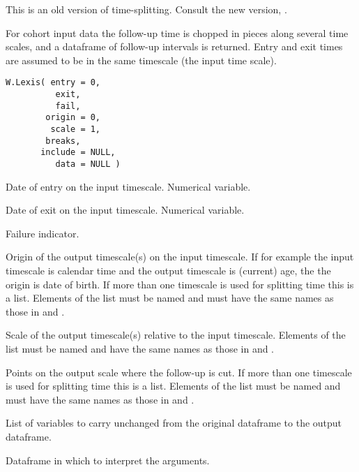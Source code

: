 \begin{Description}\relax
This is an old version of time-splitting. Consult the new version,
.

For cohort input data the follow-up time is chopped in pieces along
several time scales, and a dataframe of follow-up intervals is
returned. Entry and exit times are assumed to be in the same timescale
(the input time scale).
\end{Description}
\begin{Usage}
\begin{verbatim}
W.Lexis( entry = 0,
          exit,
          fail,
        origin = 0,
         scale = 1,
        breaks,
       include = NULL,
          data = NULL )
\end{verbatim}
\end{Usage}
\begin{Arguments}
\begin{ldescription}
\item[\code{entry}] Date of entry on the input timescale. Numerical variable.
\item[\code{exit}] Date of exit on the input timescale. Numerical variable.
\item[\code{fail}] Failure indicator.
\item[\code{origin}] Origin of the output timescale(s) on the input
timescale. If for example the input timescale is calendar time and
the output timescale is (current) age, the the origin is date of
birth. If more than one timescale is used for splitting time
this is a list. Elements of the list must be named and must have the
same names as those in  and .
\item[\code{scale}] Scale of the output timescale(s) relative to the input
timescale. Elements of the list must be named and have the same
names as those in  and .
\item[\code{breaks}] Points on the output scale where the follow-up is
cut. If more than one timescale is used for splitting time this is a
list. Elements of the list must be named and must have the same
names as those in  and .
\item[\code{include}] List of variables to carry unchanged from the original
dataframe to the output dataframe.
\item[\code{data}] Dataframe in which to interpret the arguments.
\end{ldescription}
\end{Arguments}
